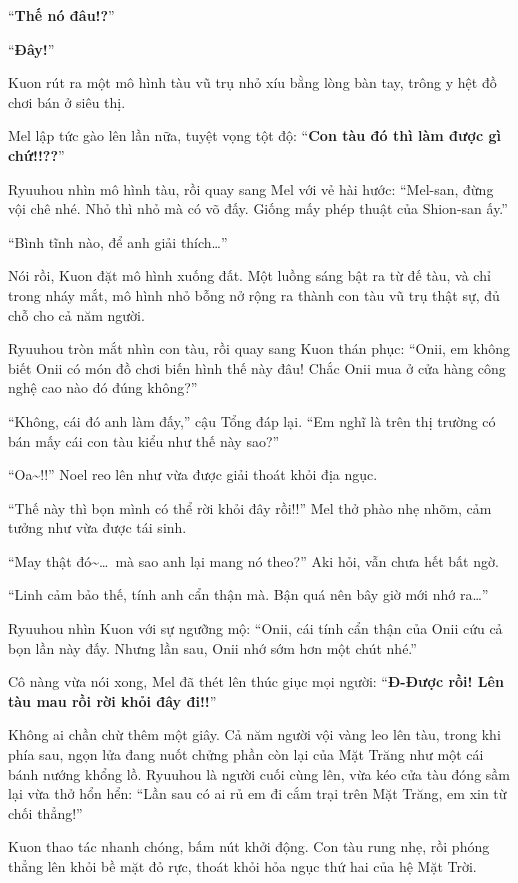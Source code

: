 \documentclass[../main.tex]{subfiles}
\begin{document}
``\textbf{Thế nó đâu!?}''

``\textbf{Đây!}''

Kuon rút ra một mô hình tàu vũ trụ nhỏ xíu bằng lòng bàn tay, trông y hệt đồ chơi bán ở siêu thị.

Mel lập tức gào lên lần nữa, tuyệt vọng tột độ: ``\textbf{Con tàu đó thì làm được gì chứ!!??}''

Ryuuhou nhìn mô hình tàu, rồi quay sang Mel với vẻ hài hước: ``Mel-san, đừng vội chê nhé. Nhỏ thì nhỏ mà có võ đấy. Giống mấy phép thuật của Shion-san ấy.''

``Bình tĩnh nào, để anh giải thích\dots''

Nói rồi, Kuon đặt mô hình xuống đất. Một luồng sáng bật ra từ đế tàu, và chỉ trong nháy mắt, mô hình nhỏ bỗng nở rộng ra thành con tàu vũ trụ thật sự, đủ chỗ cho cả năm người.

Ryuuhou tròn mắt nhìn con tàu, rồi quay sang Kuon thán phục: ``Onii, em không biết Onii có món đồ chơi biến hình thế này đâu! Chắc Onii mua ở cửa hàng công nghệ cao nào đó đúng không?''

``Không, cái đó anh làm đấy,'' cậu Tổng đáp lại. ``Em nghĩ là trên thị trường có bán mấy cái con tàu kiểu như thế này sao?''

``Oa\~{}!!'' Noel reo lên như vừa được giải thoát khỏi địa ngục.

``Thế này thì bọn mình có thể rời khỏi đây rồi!!'' Mel thở phào nhẹ nhõm, cảm tưởng như vừa được tái sinh.

``May thật đó\~{}\dots\ mà sao anh lại mang nó theo?'' Aki hỏi, vẫn chưa hết bất ngờ.

``Linh cảm bảo thế, tính anh cẩn thận mà. Bận quá nên bây giờ mới nhớ ra\dots''

Ryuuhou nhìn Kuon với sự ngưỡng mộ: ``Onii, cái tính cẩn thận của Onii cứu cả bọn lần này đấy. Nhưng lần sau, Onii nhớ sớm hơn một chút nhé.''

Cô nàng vừa nói xong, Mel đã thét lên thúc giục mọi người: ``\textbf{Đ-Được rồi! Lên tàu mau rồi rời khỏi đây đi!!}''

Không ai chần chừ thêm một giây. Cả năm người vội vàng leo lên tàu, trong khi phía sau, ngọn lửa đang nuốt chửng phần còn lại của Mặt Trăng như một cái bánh nướng khổng lồ. Ryuuhou là người cuối cùng lên, vừa kéo cửa tàu đóng sầm lại vừa thở hổn hển: ``Lần sau có ai rủ em đi cắm trại trên Mặt Trăng, em xin từ chối thẳng!''

Kuon thao tác nhanh chóng, bấm nút khởi động. Con tàu rung nhẹ, rồi phóng thẳng lên khỏi bề mặt đỏ rực, thoát khỏi hỏa ngục thứ hai của hệ Mặt Trời.
\end{document}
